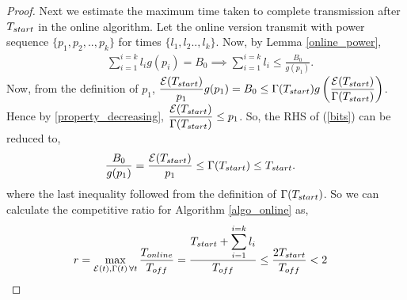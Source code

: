 \begin{proof}

Next we estimate the maximum time taken to complete transmission after $T_{\mbox{\scriptsize{start}}}$ in the online algorithm. Let the online version transmit with power sequence $\{p_1,p_2,..,p_k\}$ for times $\{l_1,l_2..,l_k\} $. Now, by Lemma \ref{online_power},
\begin{align}
&\sum_{i=1}^{i=k}l_ig(p_i)=B_0\implies\sum_{i=1}^{i=k}l_i\le \frac{B_0}{g(p_1)}.\label{bits}
\end{align}
Now, from the definition of $p_1$, $\dfrac{\ETx(T_{\mbox{\scriptsize{start}}})}{p_1}g(p_1)=B_0 \le \TRx(T_{\mbox{\scriptsize{start}}}) g\left( \dfrac{\ETx(T_{\mbox{\scriptsize{start}}})}{\TRx(T_{\mbox{\scriptsize{start}}})} \right)$. Hence by \eqref{property_decreasing}, $\dfrac{\ETx(T_{\mbox{\scriptsize{start}}})}{\TRx(T_{\mbox{\scriptsize{start}}})}\le p_1$.\vspace{2pt}
So, the RHS of (\ref{bits}) can be reduced to, 
\begin{align}
&\frac{B_0}{g(p_1)} = \frac{\ETx(T_{\mbox{\scriptsize{start}}})}{p_1} \le \TRx(T_{\mbox{\scriptsize{start}}})\le T_{\mbox{\scriptsize{start}}}.
\end{align}
where the last inequality followed from the definition of $\TRx(T_{\mbox{\scriptsize{start}}})$. So we can calculate the competitive ratio for Algorithm \ref{algo_online} as,
\begin{align*}
&r=\displaystyle\max_{\ETx(t),\TRx(t)\hspace{0.5mm} \forall t}\dfrac{T_{\mbox{\scriptsize{online}}}}{T_{\mbox{\scriptsize{off}}}} = \dfrac{T_{\mbox{\scriptsize{start}}}+\displaystyle\sum_{i=1}^{i=k}l_i}{T_{\mbox{\scriptsize{off}}}} \le \dfrac{2 T_{\mbox{\scriptsize{start}}}}{T_{\mbox{\scriptsize{off}}}} < 2
\end{align*}
\end{proof}
